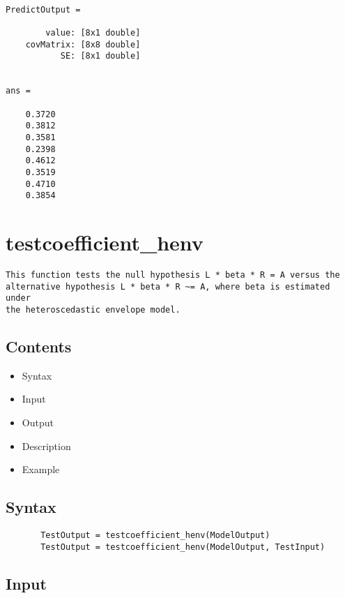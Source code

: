\documentclass[a4paper,11pt,openany]{memoir}
\begin{document}
        \color{lightgray}\ttfamily \begin{verbatim}

PredictOutput = 

        value: [8x1 double]
    covMatrix: [8x8 double]
           SE: [8x1 double]


ans =

    0.3720
    0.3812
    0.3581
    0.2398
    0.4612
    0.3519
    0.4710
    0.3854

\end{verbatim} \rmfamily
\color{black}
    
\newpage

\rmfamily
\color{black}\section{testcoefficient\_henv}


\begin{verbatim}This function tests the null hypothesis L * beta * R = A versus the
alternative hypothesis L * beta * R ~= A, where beta is estimated under
the heteroscedastic envelope model.\end{verbatim}
    
\subsection*{Contents}

\begin{itemize}
\setlength{\itemsep}{-1ex}
   \item Syntax
   \item Input
   \item Output
   \item Description
   \item Example
\end{itemize}


\subsection*{Syntax}


\begin{verbatim}       TestOutput = testcoefficient_henv(ModelOutput)
       TestOutput = testcoefficient_henv(ModelOutput, TestInput)\end{verbatim}
    

\subsection*{Input}
\end{document}
